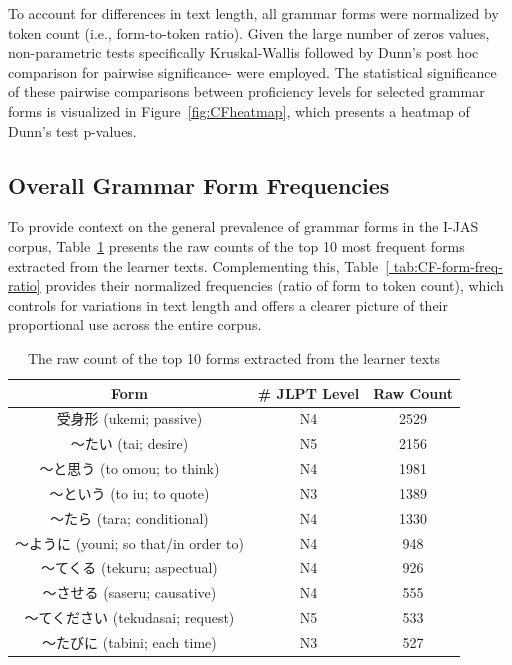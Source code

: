 To account for differences in text length, all grammar forms were normalized by token count (i.e., form-to-token
ratio). Given the large number of zeros values, non-parametric tests specifically Kruskal-Wallis followed by Dunn's
post hoc comparison for pairwise significance- were employed. The statistical significance of these pairwise
comparisons between proficiency levels for selected grammar forms is visualized in Figure~\ref{fig:CFheatmap}, which
presents a heatmap of Dunn's test p-values.


\subsection{Overall Grammar Form Frequencies}
To provide context on the general prevalence of grammar forms in the I-JAS corpus, Table~\ref{tab:CF-form-freq}
presents the raw counts of the top 10 most frequent forms extracted from the learner texts. Complementing this,
Table~\ref{
tab:CF-form-freq-ratio} provides their normalized frequencies (ratio of form to token count), which controls for
variations in text length and offers a clearer picture of their proportional use across the entire corpus.


\begin{table}[h!]
\centering
\begin{tabular}{ccc}
\hline \textbf{Form} & \textbf{\# JLPT Level} & \textbf{Raw Count} \\ \hline
受身形 (ukemi; passive)                & N4 & 2529 \\
〜たい (tai; desire)                  & N5 & 2156 \\
〜と思う (to omou; to think)          & N4 & 1981 \\
〜という (to iu; to quote)            & N3 & 1389 \\
〜たら (tara; conditional)            & N4 & 1330 \\
〜ように (youni; so that/in order to) & N4 & 948 \\
〜てくる (tekuru; aspectual)          & N4 & 926 \\
〜させる (saseru; causative)          & N4 & 555 \\
〜てください (tekudasai; request)     & N5 & 533 \\
〜たびに (tabini; each time)          & N3 & 527 \\
\hline
\end{tabular}
\caption[Raw frequency of Top 10 Forms extracted from the I-JAS Corpus]{The raw count of the top 10 forms extracted
from the learner texts}
\label{tab:CF-form-freq}
\end{table}

